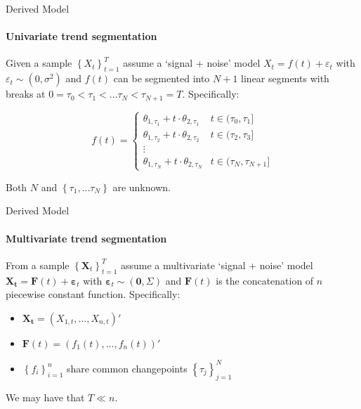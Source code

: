 \documentclass{beamer}
\begin{document}
\begin{frame}{Derived Model}
\framesubtitle{Univariate trend segmentation}

Given a sample $\left \{ X_t \right \}_{t=1}^{T}$ assume a `signal + noise' model $X_t = f(t) + \varepsilon_t$ with $\varepsilon_t \sim \left ( 0, \sigma^2 \right )$ and $f(t)$ can be segmented into $N+1$ linear segments with breaks at $0 = \tau_0 < \tau_1 < \dots \tau_N < \tau_{N+1}=T$. Specifically: 

\bigskip

\begin{equation*}
f(t) = 
\left\{\begin{matrix}
        \theta_{1,\tau_1} + t \cdot \theta_{2,\tau_1} & t \in (\tau_0, \tau_1] \\ 
        \theta_{1,\tau_2} + t \cdot \theta_{2,\tau_2} & t \in (\tau_2, \tau_3]\\ 
        \vdots & \\ 
        \theta_{1,\tau_N} + t \cdot \theta_{2,\tau_N} & t \in (\tau_N,\tau_{N+1}]
\end{matrix}\right.
\end{equation*}

\bigskip

Both $N$ and $\left \{ \tau_1, \dots \tau_N \right \}$ are unknown.

\end{frame}




\begin{frame}{Derived Model}
\framesubtitle{Multivariate trend segmentation}

From a sample $\left \{ \boldsymbol{X}_t \right \}_{t=1}^T$ assume a multivariate `signal + noise' model $\boldsymbol{X_t} = \boldsymbol{F}(t) + \boldsymbol{\varepsilon}_t$ with $\boldsymbol{\varepsilon}_t \sim \left ( \boldsymbol{0}, \Sigma \right )$ and $\boldsymbol{F}(t)$ is the concatenation of $n$ piecewise constant function. Specifically: 

\bigskip

\begin{itemize}
    \item $\boldsymbol{X_t} = \left ( X_{1,t},...,X_{n,t}\right )'$
    \item $\boldsymbol{F}(t) = \left ( f_1(t), ..., f_n(t)\right )'$
    \item $\left \{ f_i\right \}_{i=1}^n$ share common changepoints $\left \{ \tau_j \right \} _{j=1}^N$
\end{itemize}

\bigskip

We may have that $T \ll n$. 

\end{frame}
\end{document}
